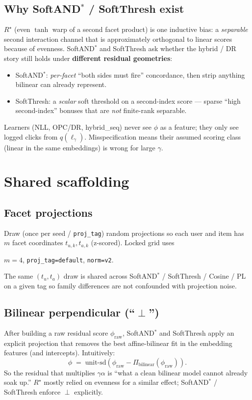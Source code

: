 \documentclass[11pt,a4paper]{article}
\begin{document}
\subsection{Why SoftAND$^*$ / SoftThresh exist}
$R^\star$ (even $\tanh$ warp of a second facet product) is one inductive bias:
a \emph{separable} second interaction channel that is approximately orthogonal
to linear scores because of evenness.
SoftAND$^*$ and SoftThresh ask whether the hybrid / DR story still holds under
\textbf{different residual geometries}:
\begin{itemize}[leftmargin=1.2em]
\item SoftAND$^*$: \emph{per-facet} ``both sides must fire'' concordance, then
  strip anything bilinear can already represent.
\item SoftThresh: a \emph{scalar} soft threshold on a second-index score ---
  sparse ``high second-index'' bonuses that are \emph{not} finite-rank separable.
\end{itemize}

Learners (NLL, OPC/DR, hybrid\_seq) never see $\phi$ as a feature; they only
see logged clicks from $q(\ell_\gamma)$. Misspecification means their
assumed scoring class (linear in the same embeddings) is wrong for large $\gamma$.

\section{Shared scaffolding}

\subsection{Facet projections}
Draw (once per seed / \texttt{proj\_tag}) random projections so each user and
item has $m$ facet coordinates $t_{u,k}, t_{a,k}$ (z-scored). Locked grid uses
\begin{center}
$m=4$, \texttt{proj\_tag=default}, \texttt{norm=v2}.
\end{center}
The same $(t_u,t_a)$ draw is shared across SoftAND$^*$ / SoftThresh / Cosine /
PL on a given tag so family differences are not confounded with projection noise.

\subsection{Bilinear perpendicular (``$\perp$'')}
After building a raw residual score $\phi_{\mathrm{raw}}$, SoftAND$^*$ and
SoftThresh apply an explicit projection that removes the best affine-bilinear
fit in the embedding features (and intercepts). Intuitively:
\begin{equation}
\phi \;=\; \mathrm{unit\text{-}sd}\!\left(\phi_{\mathrm{raw}} - \Pi_{\mathrm{bilinear}}(\phi_{\mathrm{raw}})\right).
\end{equation}
So the residual that multiplies $\gamma\alpha$ is ``what a clean bilinear
model cannot already soak up.'' $R^\star$ mostly relied on evenness for a
similar effect; SoftAND$^*$ / SoftThresh enforce $\perp$ explicitly.
\end{document}
